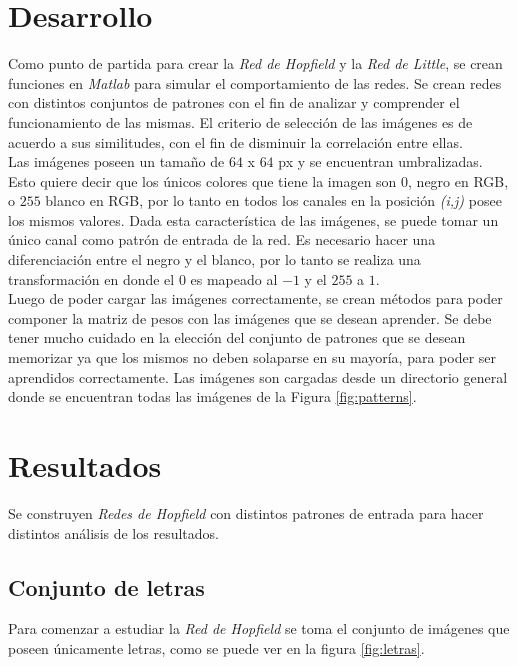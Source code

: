 \documentclass{sig-alternate}
\begin{document}
\section*{Desarrollo}
Como punto de partida para crear la \textit{Red de Hopfield} y la \textit{Red de Little}, se crean funciones en \textit{Matlab} para simular el comportamiento de las redes. Se crean redes con distintos conjuntos de patrones con el fin de analizar y comprender el funcionamiento de las mismas. El criterio de selección de las imágenes es de acuerdo a sus similitudes, con el fin de disminuir la correlación entre ellas.\\
Las imágenes poseen un tamaño de $64$ x $64$ px y se encuentran umbralizadas. Esto quiere decir que los únicos colores que tiene la imagen son $0$, negro en RGB, o $255$ blanco en RGB, por lo tanto en todos los canales en la posición \textit{(i,j)} posee los mismos valores. Dada esta característica de las imágenes, se puede tomar un único canal como patrón de entrada de la red. Es necesario hacer una diferenciación entre el negro y el blanco, por lo tanto se realiza una transformación en donde el $0$ es mapeado al $-1$ y el $255$ a $1$.\\
Luego de poder cargar las imágenes correctamente, se crean métodos para poder componer la matriz de pesos con las imágenes que se desean aprender. Se debe tener mucho cuidado en la elección del conjunto de patrones que se desean memorizar ya que los mismos no deben solaparse en su mayoría, para poder ser aprendidos correctamente. Las imágenes son cargadas desde un directorio general donde se encuentran todas las imágenes de la Figura \ref{fig:patterns}. 
\section*{Resultados }

Se construyen \textit{Redes de Hopfield} con distintos patrones de entrada para hacer distintos análisis de los resultados.

\subsection*{Conjunto de letras}

Para comenzar a estudiar la \textit{Red de Hopfield} se toma el conjunto de imágenes que poseen únicamente letras, como se puede ver en la figura \ref{fig:letras}.
\end{document}
